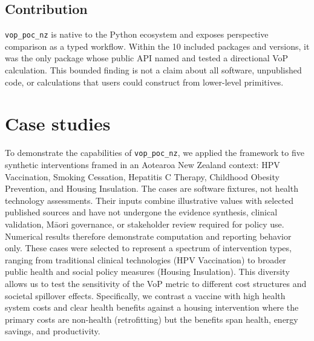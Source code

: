 \documentclass[article]{jss}
\newcommand{\pkg}[1]{\texttt{#1}}
\begin{document}
\subsection{Contribution}
\pkg{vop\_poc\_nz} is native to the Python ecosystem and exposes perspective
comparison as a typed workflow. Within the 10 included packages and versions,
it was the only package whose public API named and tested a directional VoP
calculation. This bounded finding is not a claim about all software, unpublished
code, or calculations that users could construct from lower-level primitives.

\section{Case studies} \label{sec:cases}

To demonstrate the capabilities of \pkg{vop\_poc\_nz}, we applied the framework to five synthetic interventions framed in an Aotearoa New Zealand context: HPV Vaccination, Smoking Cessation, Hepatitis C Therapy, Childhood Obesity Prevention, and Housing Insulation.
The cases are software fixtures, not health technology assessments. Their inputs combine illustrative values with selected published sources and have not undergone the evidence synthesis, clinical validation, M\={a}ori governance, or stakeholder review required for policy use. Numerical results therefore demonstrate computation and reporting behavior only.
These cases were selected to represent a spectrum of intervention types, ranging from traditional clinical technologies (HPV Vaccination) to broader public health and social policy measures (Housing Insulation).
This diversity allows us to test the sensitivity of the VoP metric to different cost structures and societal spillover effects.
Specifically, we contrast a vaccine with high health system costs and clear health benefits against a housing intervention where the primary costs are non-health (retrofitting) but the benefits span health, energy savings, and productivity.
\end{document}
